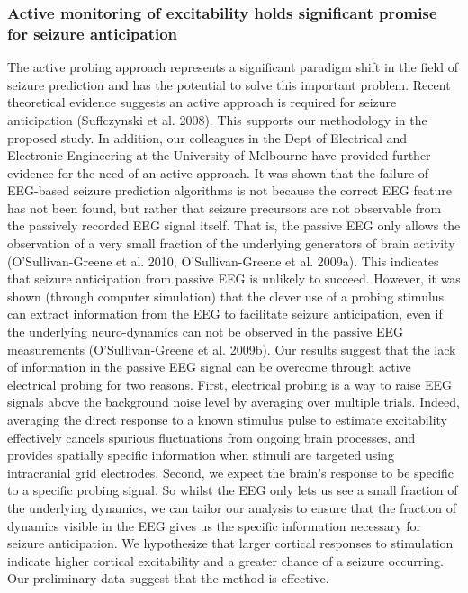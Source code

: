 \documentclass[]{article}
\begin{document}
\subsubsection{Active monitoring of excitability holds significant promise for seizure anticipation}
The active probing approach represents a significant paradigm shift in the field of seizure prediction and has the potential to solve this important problem. Recent theoretical evidence suggests an active approach is required for seizure anticipation (Suffczynski et al. 2008). This supports our methodology in the proposed study. In addition, our colleagues in the Dept of Electrical and Electronic Engineering at the University of Melbourne have provided further evidence for the need of an active approach. It was shown that the failure of EEG-based seizure prediction algorithms is not because the correct EEG feature has not been found, but rather that seizure precursors are not observable from the passively recorded EEG signal itself.  That is, the passive EEG only allows the observation of a very small fraction of the underlying generators of brain activity (O’Sullivan-Greene et al. 2010, O’Sullivan-Greene et al. 2009a). This indicates that seizure anticipation from passive EEG is unlikely to succeed. However, it was shown (through computer simulation) that the clever use of a probing stimulus can extract information from the EEG to facilitate seizure anticipation, even if the underlying neuro-dynamics can not be observed in the passive EEG measurements (O’Sullivan-Greene et al. 2009b). 
Our results suggest that the lack of information in the passive EEG signal can be overcome through active electrical probing for two reasons. First, electrical probing is a way to raise EEG signals above the background noise level by averaging over multiple trials. Indeed, averaging the direct response to a known stimulus pulse to estimate excitability effectively cancels spurious fluctuations from ongoing brain processes, and provides spatially specific information when stimuli are targeted using intracranial grid electrodes. Second, we expect the brain’s response to be specific to a specific probing signal.  So whilst the EEG only lets us see a small fraction of the underlying dynamics, we can tailor our analysis to ensure that the fraction of dynamics visible in the EEG gives us the specific information necessary for seizure anticipation.
We hypothesize that larger cortical responses to stimulation indicate higher cortical excitability and a greater chance of a seizure occurring. Our preliminary data suggest that the method is effective.
\end{document}
